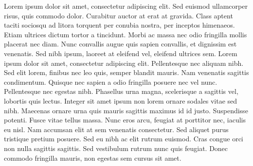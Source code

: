 Lorem ipsum dolor sit amet, consectetur adipiscing elit.  Sed euismod ullamcorper risus, quis commodo dolor. Curabitur auctor at erat at gravida. Class aptent taciti sociosqu ad litora torquent per conubia nostra, per inceptos himenaeos. Etiam ultrices dictum tortor a tincidunt. Morbi ac massa nec odio fringilla mollis placerat nec diam. Nunc convallis augue quis sapien convallis, et dignissim est venenatis. Sed nibh ipsum, laoreet at eleifend vel, eleifend ultrices sem. Lorem ipsum dolor sit amet, consectetur adipiscing elit. Pellentesque nec aliquam nibh. Sed elit lorem, finibus nec leo quis, semper blandit mauris.
Nam venenatis sagittis condimentum. Quisque nec sapien a odio fringilla posuere nec vel nunc. Pellentesque nec egestas nibh. Phasellus urna magna, scelerisque a sagittis vel, lobortis quis lectus. Integer sit amet ipsum non lorem ornare sodales vitae sed nibh. Maecenas ornare urna quis mauris sagittis maximus id id justo. Suspendisse potenti. Fusce vitae tellus massa. Nunc eros arcu, feugiat at porttitor nec, iaculis eu nisl. Nam accumsan elit at sem venenatis consectetur. Sed aliquet purus tristique pretium posuere. Sed eu nibh ac elit rutrum euismod. Cras congue orci non nulla sagittis sagittis. Sed vestibulum rutrum nunc quis feugiat. Donec commodo fringilla mauris, non egestas sem cursus sit amet.